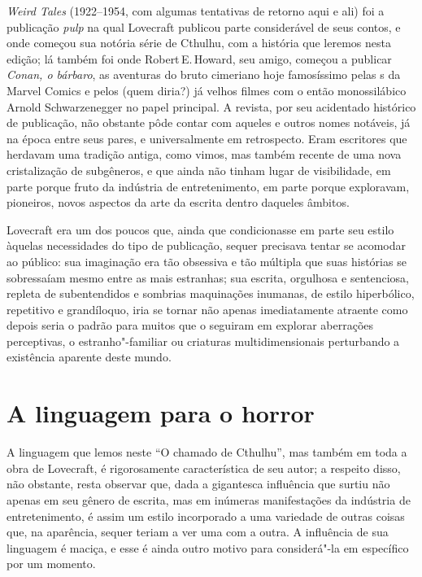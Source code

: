 \emph{Weird Tales} (1922--1954, com algumas tentativas de retorno aqui e
ali) foi a publicação \emph{pulp} na qual Lovecraft publicou parte
considerável de seus contos, e onde começou sua notória série de
Cthulhu, com a história que leremos nesta edição; lá também foi onde
Robert\,E.\,Howard, seu amigo, começou a publicar \emph{Conan, o bárbaro},
as aventuras do bruto cimeriano hoje famosíssimo pelas s da Marvel
Comics e pelos (quem diria?) já velhos filmes com o então monossilábico
Arnold Schwarzenegger no papel principal. A revista, por seu acidentado
histórico de publicação, não obstante pôde contar com aqueles e outros
nomes notáveis, já na época entre seus pares, e universalmente em
retrospecto. Eram escritores que herdavam uma tradição antiga, como
vimos, mas também recente de uma nova cristalização de subgêneros, e que
ainda não tinham lugar de visibilidade, em parte porque fruto da
indústria de entretenimento, em parte porque exploravam, pioneiros,
novos aspectos da arte da escrita dentro daqueles âmbitos.

Lovecraft era um dos poucos que, ainda que condicionasse em parte seu
estilo àquelas necessidades do tipo de publicação, sequer precisava
tentar se acomodar ao público: sua imaginação era tão obsessiva e tão
múltipla que suas histórias se sobressaíam mesmo entre as mais
estranhas; sua escrita, orgulhosa e sentenciosa, repleta de
subentendidos e sombrias maquinações inumanas, de estilo hiperbólico,
repetitivo e grandíloquo, iria se tornar não apenas imediatamente
atraente como depois seria o padrão para muitos que o seguiram em
explorar aberrações perceptivas, o estranho"-familiar ou criaturas
multidimensionais perturbando a existência aparente deste mundo.

\section{A linguagem para o horror}

A linguagem que lemos neste ``O chamado de Cthulhu'', mas também em toda
a obra de Lovecraft, é rigorosamente característica de seu autor; a
respeito disso, não obstante, resta observar que, dada a gigantesca
influência que surtiu não apenas em seu gênero de escrita, mas em
inúmeras manifestações da indústria de entretenimento, é assim um estilo
incorporado a uma variedade de outras coisas que, na aparência, sequer
teriam a ver uma com a outra. A influência de sua linguagem é maciça, e
esse é ainda outro motivo para considerá"-la em específico por um
momento.

